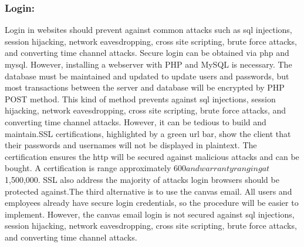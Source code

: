 \documentclass[letterpaper,10pt,titlepage,journal,compsoc,draftclsnofoot,onecolumn]{IEEEtran}
\newcommand\tab[1][1cm]{\hspace*{#1}}
\begin{document}
\subsubsection{Login:}
\tab Login in websites should prevent against common attacks such as sql injections, session hijacking, network eavesdropping, cross site scripting, brute force attacks,  and converting time channel attacks. \newline\newline\tab Secure login can be obtained via php and mysql. However, installing a webserver with PHP and MySQL is necessary. The database must be maintained and updated to update users and passwords, but most transactions between the server and database will be encrypted by PHP POST method. This kind of method prevents against sql injections, session hijacking, network eavesdropping, cross site scripting, brute force attacks,  and converting time channel attacks. However, it can be tedious to build and maintain.\newline\newline\tab SSL certifications, highlighted by a green url bar, show the client that their passwords and usernames will not be displayed in plaintext. The certification ensures the http will be secured against malicious attacks and can be bought. A certification is range approximately  $600 and warranty ranging at $1,500,000. SSL also address the majority of attacks login browsers should be protected against.\newline\newline\tab The third alternative is to use the canvas email. All users and employees already have secure login credentials, so the procedure will be easier to implement. However, the canvas email login is not secured against sql injections, session hijacking, network eavesdropping, cross site scripting, brute force attacks,  and converting time channel attacks.\newline
\end{document}
